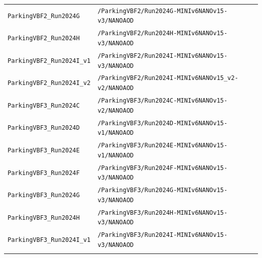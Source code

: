 \begin{longtable}{@{}>{\RaggedRight\arraybackslash}p{} >{\RaggedRight\arraybackslash}p{}@{}}
\addlinespace[2pt]
\texttt{ParkingVBF2\_\allowbreak{}Run2024G} & \texttt{/\allowbreak{}ParkingVBF2/\allowbreak{}Run2024G-\allowbreak{}MINIv6NANOv15-\allowbreak{}v3/\allowbreak{}NANOAOD} \\
\addlinespace[2pt]
\texttt{ParkingVBF2\_\allowbreak{}Run2024H} & \texttt{/\allowbreak{}ParkingVBF2/\allowbreak{}Run2024H-\allowbreak{}MINIv6NANOv15-\allowbreak{}v3/\allowbreak{}NANOAOD} \\
\addlinespace[2pt]
\texttt{ParkingVBF2\_\allowbreak{}Run2024I\_\allowbreak{}v1} & \texttt{/\allowbreak{}ParkingVBF2/\allowbreak{}Run2024I-\allowbreak{}MINIv6NANOv15-\allowbreak{}v3/\allowbreak{}NANOAOD} \\
\addlinespace[2pt]
\texttt{ParkingVBF2\_\allowbreak{}Run2024I\_\allowbreak{}v2} & \texttt{/\allowbreak{}ParkingVBF2/\allowbreak{}Run2024I-\allowbreak{}MINIv6NANOv15\_\allowbreak{}v2-\allowbreak{}v2/\allowbreak{}NANOAOD} \\
\addlinespace[2pt]
\texttt{ParkingVBF3\_\allowbreak{}Run2024C} & \texttt{/\allowbreak{}ParkingVBF3/\allowbreak{}Run2024C-\allowbreak{}MINIv6NANOv15-\allowbreak{}v2/\allowbreak{}NANOAOD} \\
\addlinespace[2pt]
\texttt{ParkingVBF3\_\allowbreak{}Run2024D} & \texttt{/\allowbreak{}ParkingVBF3/\allowbreak{}Run2024D-\allowbreak{}MINIv6NANOv15-\allowbreak{}v1/\allowbreak{}NANOAOD} \\
\addlinespace[2pt]
\texttt{ParkingVBF3\_\allowbreak{}Run2024E} & \texttt{/\allowbreak{}ParkingVBF3/\allowbreak{}Run2024E-\allowbreak{}MINIv6NANOv15-\allowbreak{}v1/\allowbreak{}NANOAOD} \\
\addlinespace[2pt]
\texttt{ParkingVBF3\_\allowbreak{}Run2024F} & \texttt{/\allowbreak{}ParkingVBF3/\allowbreak{}Run2024F-\allowbreak{}MINIv6NANOv15-\allowbreak{}v3/\allowbreak{}NANOAOD} \\
\addlinespace[2pt]
\texttt{ParkingVBF3\_\allowbreak{}Run2024G} & \texttt{/\allowbreak{}ParkingVBF3/\allowbreak{}Run2024G-\allowbreak{}MINIv6NANOv15-\allowbreak{}v3/\allowbreak{}NANOAOD} \\
\addlinespace[2pt]
\texttt{ParkingVBF3\_\allowbreak{}Run2024H} & \texttt{/\allowbreak{}ParkingVBF3/\allowbreak{}Run2024H-\allowbreak{}MINIv6NANOv15-\allowbreak{}v3/\allowbreak{}NANOAOD} \\
\addlinespace[2pt]
\texttt{ParkingVBF3\_\allowbreak{}Run2024I\_\allowbreak{}v1} & \texttt{/\allowbreak{}ParkingVBF3/\allowbreak{}Run2024I-\allowbreak{}MINIv6NANOv15-\allowbreak{}v3/\allowbreak{}NANOAOD} \\
\addlinespace[2pt]

\end{longtable}
